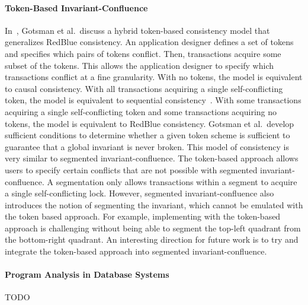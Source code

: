 \paragraph{Token-Based Invariant-Confluence}
In~\cite{gotsman2016cause}, Gotsman et al.\ discuss a hybrid token-based
consistency model that generalizes RedBlue consistency. An application designer
defines a set of tokens and specifies which pairs of tokens conflict. Then,
transactions acquire some subset of the tokens. This allows the application
designer to specify which transactions conflict at a fine granularity. With no
tokens, the model is equivalent to causal consistency. With all transactions
acquiring a single self-conflicting token, the model is equivalent to
sequential consistency~\cite{lamport1979make}. With some transactions acquiring
a single self-conflicting token and some transactions acquiring no tokens, the
model is equivalent to RedBlue consistency. Gotsman et al.\ develop sufficient
conditions to determine whether a given token scheme is sufficient to guarantee
that a global invariant is never broken. This model of consistency is very
similar to segmented invariant-confluence. The token-based approach allows
users to specify certain conflicts that are not possible with segmented
invariant-confluence. A segmentation only allows transactions within a segment
to acquire a single self-conflicting lock. However, segmented
invariant-confluence also introduces the notion of segmenting the invariant,
which cannot be emulated with the token based approach. For example,
implementing  with the token-based approach is
challenging without being able to segment the top-left quadrant from the
bottom-right quadrant. An interesting direction for future work is to try and
integrate the token-based approach into segmented invariant-confluence.

%

\paragraph{Program Analysis in Database Systems}
TODO

